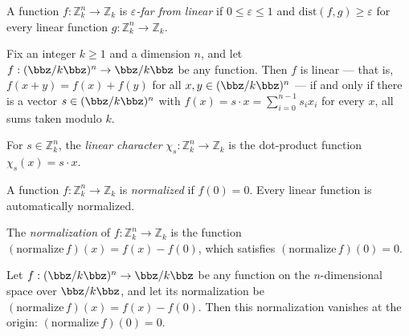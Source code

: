 \begin{definition}
\label{ZkBLR.epsilon_far_from_linear}
\leanok
{}
A function $f : \mathbb{Z}_k^n \to \mathbb{Z}_k$ is
\emph{$\varepsilon$-far from linear} if $0 \le \varepsilon \le 1$ and
$\mathrm{dist}(f,g) \ge \varepsilon$ for every linear function
$g : \mathbb{Z}_k^n \to \mathbb{Z}_k$.
\end{definition}

\begin{lemma}
\label{ZkBLR.linear_iff_character}
\leanok
{}
Fix an integer $k \ge 1$ and a dimension $n$, and let $f : (\bbz/k\bbz)^n \to
\bbz/k\bbz$ be any function. Then $f$ is linear — that is, $f(x+y) = f(x) + f(y)$ for
all $x, y \in (\bbz/k\bbz)^n$ — if and only if there is a vector $s \in (\bbz/k\bbz)^n$
with $f(x) = s \cdot x = \sum_{i=0}^{n-1} s_i x_i$ for every $x$, all sums taken modulo
$k$.
\end{lemma}

\begin{definition}
\label{ZkBLR.linear_character}
\leanok
{}
For $s \in \mathbb{Z}_k^n$, the \emph{linear character} $\chi_s :
\mathbb{Z}_k^n \to \mathbb{Z}_k$ is the dot-product function
$\chi_s(x) = s \cdot x$.
\end{definition}

\begin{definition}
\label{ZkBLR.normalized}
\leanok
{}
A function $f : \mathbb{Z}_k^n \to \mathbb{Z}_k$ is \emph{normalized} if
$f(0) = 0$.  Every linear function is automatically normalized.
\end{definition}

\begin{definition}
\label{ZkBLR.normalize}
\leanok
{}
The \emph{normalization} of $f : \mathbb{Z}_k^n \to \mathbb{Z}_k$ is the
function $(\mathrm{normalize}\,f)(x) = f(x) - f(0)$, which satisfies
$(\mathrm{normalize}\,f)(0) = 0$.
\end{definition}

\begin{lemma}
\label{ZkBLR.normalize_zero}
\leanok
{}
Let $f : (\bbz/k\bbz)^n \to \bbz/k\bbz$ be any function on the $n$-dimensional space
over $\bbz/k\bbz$, and let its normalization be $(\mathrm{normalize}\,f)(x) = f(x) -
f(0)$. Then this normalization vanishes at the origin: $(\mathrm{normalize}\,f)(0) = 0$.
\end{lemma}

